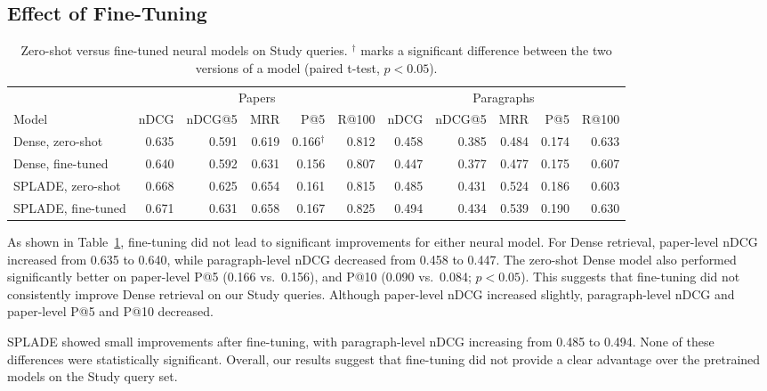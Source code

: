 \documentclass[sigconf,nonacm]{acmart}
\begin{document}
\subsection{Effect of Fine-Tuning}
\label{sec:finetune}
\begin{table}[t]
  \caption{Zero-shot versus fine-tuned neural models on Study queries.
    $^{\dagger}$ marks a significant difference between the two versions of a
    model (paired t-test, $p < 0.05$).}
  \label{tab:finetune}
  \small
  \begin{tabular}{lrrrrrrrrrr}
    \toprule
    & \multicolumn{5}{c}{Papers} & \multicolumn{5}{c}{Paragraphs} \\
    \cmidrule(lr){2-6} \cmidrule(lr){7-11}
    Model & nDCG & nDCG@5 & MRR & P@5 & R@100 & nDCG & nDCG@5 & MRR & P@5 & R@100 \\
    \midrule
    Dense, zero-shot   & 0.635 & 0.591 & 0.619 & 0.166$^{\dagger}$ & 0.812 & 0.458 & 0.385 & 0.484 & 0.174 & 0.633 \\
    Dense, fine-tuned  & 0.640 & 0.592 & 0.631 & 0.156 & 0.807 & 0.447 & 0.377 & 0.477 & 0.175 & 0.607 \\
    \midrule
    SPLADE, zero-shot  & 0.668 & 0.625 & 0.654 & 0.161 & 0.815 & 0.485 & 0.431 & 0.524 & 0.186 & 0.603 \\
    SPLADE, fine-tuned & 0.671 & 0.631 & 0.658 & 0.167 & 0.825 & 0.494 & 0.434 & 0.539 & 0.190 & 0.630 \\
    \bottomrule
  \end{tabular}
\end{table}

As shown in Table~\ref{tab:finetune}, fine-tuning
did not lead to significant improvements for either
neural model. For Dense retrieval, paper-level nDCG
increased from 0.635 to 0.640, while paragraph-level
nDCG decreased from 0.458 to 0.447. The zero-shot 
Dense model also performed significantly better on
paper-level P@5 (0.166 vs.\ 0.156), and P@10 
(0.090 vs.\ 0.084; $p< 0.05$). This suggests that
fine-tuning did not consistently improve Dense
retrieval on our Study queries. Although paper-level
nDCG increased slightly, paragraph-level nDCG and
paper-level P@5 and P@10 decreased. 

SPLADE showed small improvements after fine-tuning,
with paragraph-level nDCG increasing from 0.485 to
0.494. None of these differences were statistically 
significant. Overall, 
our results suggest that fine-tuning did not provide 
a clear advantage over the pretrained models on the 
Study query set.
\end{document}
